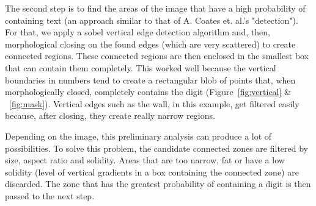 \documentclass{article} %
\begin{document}
The second step is to find the areas of the image that have a high probability of containing text (an approach similar to that of A. Coates et. al.'s "detection"\cite{coates2011text}). For that, we apply a sobel vertical edge detection algorithm and, then, morphological closing on the found edges (which are very scattered) to create connected regions. These connected regions are then enclosed in the smallest box that can contain them completely. This worked well because the vertical boundaries in numbers tend to create a rectangular blob of points that, when morphologically closed, completely contains the digit (Figure~\ref{fig:vertical} \& ~\ref{fig:mask}). Vertical edges such as the wall, in this example, get filtered easily because, after closing, they create really narrow regions.

Depending on the image, this preliminary analysis can produce a lot of possibilities. To solve this problem, the candidate connected zones are filtered by size, aspect ratio and solidity. Areas that are too narrow, fat or have a low solidity (level of vertical gradients in a box containing the connected zone) are discarded. The zone that has the greatest probability of containing a digit is then passed to the next step.
\end{document}
